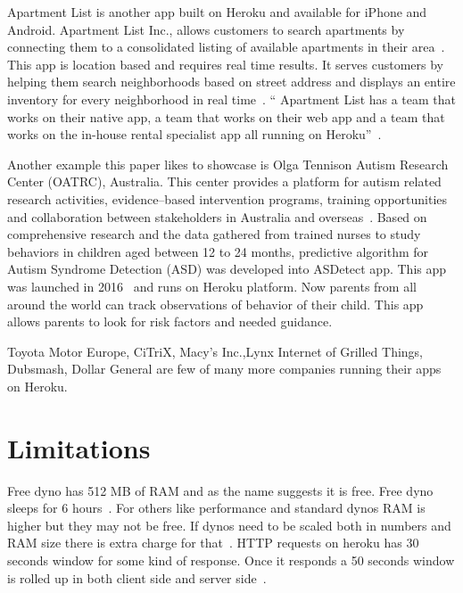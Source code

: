  Apartment List is another app built on Heroku and available for iPhone and
 Android. Apartment List Inc., allows customers to search apartments by
 connecting them to a consolidated listing of available apartments in
 their area~\cite{hid-sp18-415-www-customers-heroku-com}. This app is location based
 and requires real time results. It serves customers by helping them search
 neighborhoods based on street address and displays an entire inventory for
 every neighborhood in real time~\cite{hid-sp18-415-www-customers-heroku-com}.
 `` Apartment List has a team that works on their native app, a team
 that works on their web app and a team that works on the in-house rental
 specialist app  all running on Heroku''~\cite{hid-sp18-415-www-customers-heroku-com}.

 Another example this paper likes to showcase is Olga Tennison Autism Research
 Center (OATRC), Australia. This center provides a platform for autism related
 research activities, evidence--based intervention programs, training
 opportunities and collaboration between stakeholders in Australia and
 overseas~\cite{hid-sp18-415-www-customers-heroku-com}. Based on comprehensive research and
 the data gathered from trained nurses to study behaviors in children aged 
 between 12 to 24 months, predictive algorithm for Autism Syndrome Detection (ASD)
 was developed into ASDetect app. This app was launched in 
 2016~\cite{hid-sp18-415-www-customers-heroku-com} and runs on Heroku platform. Now parents
 from all around the world can track observations of behavior of their child.
 This app allows parents to look for risk factors and needed guidance.

 Toyota Motor Europe, CiTriX, Macy's Inc.,Lynx Internet of Grilled Things,
 Dubsmash, Dollar General are few of many more companies running their apps
 on Heroku.


\section{Limitations}

 Free dyno has 512 MB of RAM and as the name suggests it is free. Free dyno
 sleeps for 6 hours~\cite{hid-sp18-415-www-how-heroku-works}. For others like performance
 and standard dynos RAM is higher but they may not be free. If dynos need to
 be scaled both in numbers and RAM size there is extra charge for
 that~\cite{hid-sp18-415-www-how-heroku-works}. HTTP requests on heroku has 30 seconds
 window for some kind of response. Once it responds a 50 seconds window is
 rolled up in both client side and server side~\cite{hid-sp18-415-www-devcenter-herokulimits}.

